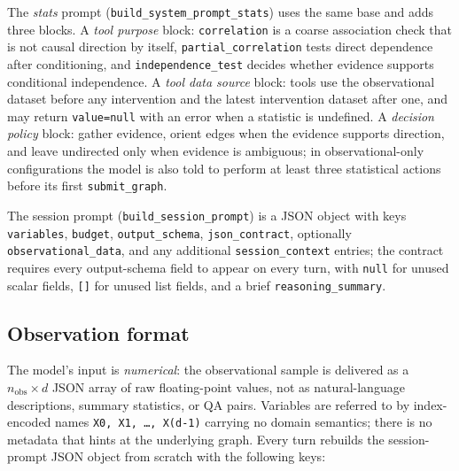 The \emph{stats} prompt (\texttt{build\_system\_prompt\_stats}) uses the same base and adds three blocks. A \emph{tool purpose} block: \texttt{correlation} is a coarse association check that is not causal direction by itself, \texttt{partial\_correlation} tests direct dependence after conditioning, and \texttt{independence\_test} decides whether evidence supports conditional independence. A \emph{tool data source} block: tools use the observational dataset before any intervention and the latest intervention dataset after one, and may return \texttt{value=null} with an error when a statistic is undefined. A \emph{decision policy} block: gather evidence, orient edges when the evidence supports direction, and leave undirected only when evidence is ambiguous; in observational-only configurations the model is also told to perform at least three statistical actions before its first \texttt{submit\_graph}.

The session prompt (\texttt{build\_session\_prompt}) is a JSON object with keys \texttt{variables}, \texttt{budget}, \texttt{output\_schema}, \texttt{json\_contract}, optionally \texttt{observational\_data}, and any additional \texttt{session\_context} entries; the contract requires every output-schema field to appear on every turn, with \texttt{null} for unused scalar fields, \texttt{[]} for unused list fields, and a brief \texttt{reasoning\_summary}.

\subsection{Observation format}
\label{app:policies:observation}

The model's input is \emph{numerical}: the observational sample is delivered as a $n_\text{obs} \times d$ JSON array of raw floating-point values, not as natural-language descriptions, summary statistics, or QA pairs. Variables are referred to by index-encoded names \texttt{X0, X1, \ldots, X(d-1)} carrying no domain semantics; there is no metadata that hints at the underlying graph. Every turn rebuilds the session-prompt JSON object from scratch with the following keys:

